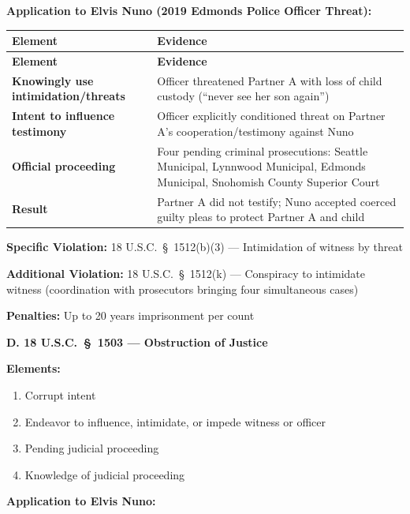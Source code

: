 \documentclass[11pt, letterpaper]{article}
\newcommand{\subsectiontitle}[1]{\vspace{0.15in}\noindent\textcolor{NavyBlue}{\textbf{#1}}\vspace{0.05in}}
\begin{document}
\textbf{Application to Elvis Nuno (2019 Edmonds Police Officer Threat):}

\begin{center}
\begin{longtable}{|p{2.0in}|p{4.0in}|}
\hline
\textbf{Element} & \textbf{Evidence} \\
\hline
\endfirsthead
\hline
\textbf{Element} & \textbf{Evidence} \\
\hline
\endhead
\textbf{Knowingly use intimidation/threats} & Officer threatened Partner A with loss of child custody (``never see her son again'') \\
\hline
\textbf{Intent to influence testimony} & Officer explicitly conditioned threat on Partner A's cooperation/testimony against Nuno \\
\hline
\textbf{Official proceeding} & Four pending criminal prosecutions: Seattle Municipal, Lynnwood Municipal, Edmonds Municipal, Snohomish County Superior Court \\
\hline
\textbf{Result} & Partner A did not testify; Nuno accepted coerced guilty pleas to protect Partner A and child \\
\hline
\end{longtable}
\end{center}

\textbf{Specific Violation:} 18 U.S.C.\ \S\ 1512(b)(3) --- Intimidation of witness by threat

\textbf{Additional Violation:} 18 U.S.C.\ \S\ 1512(k) --- Conspiracy to intimidate witness (coordination with prosecutors bringing four simultaneous cases)

\textbf{Penalties:} Up to 20 years imprisonment per count

\subsectiontitle{D. 18 U.S.C.\ \S\ 1503 --- Obstruction of Justice}

\textbf{Elements:}
\begin{enumerate}[leftmargin=*,itemsep=2pt]
    \item Corrupt intent
    \item Endeavor to influence, intimidate, or impede witness or officer
    \item Pending judicial proceeding
    \item Knowledge of judicial proceeding
\end{enumerate}

\textbf{Application to Elvis Nuno:}
\end{document}
